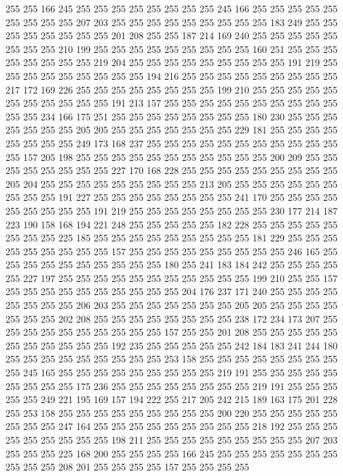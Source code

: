 255 255 166 245 255 255 255 255 255 255 255 255 245 166 255 255 255 255 255 255
255 255 255 207 203 255 255 255 255 255 255 255 255 255 183 249 255 255 255 255
255 255 255 255 201 208 255 255 187 214 169 240 255 255 255 255 255 255 255 255
210 199 255 255 255 255 255 255 255 255 255 160 251 255 255 255 255 255 255 255
255 219 204 255 255 255 255 255 255 255 255 255 191 219 255 255 255 255 255 255
255 255 255 194 216 255 255 255 255 255 255 255 255 255 217 172 169 226 255 255
255 255 255 255 255 255 199 210 255 255 255 255 255 255 255 255 255 255 255 191
213 157 255 255 255 255 255 255 255 255 255 255 255 255 234 166 175 251 255 255
255 255 255 255 255 255 180 230 255 255 255 255 255 255 255 205 205 255 255 255
255 255 255 255 229 181 255 255 255 255 255 255 255 255 249 173 168 237 255 255
255 255 255 255 255 255 255 255 255 255 157 205 198 255 255 255 255 255 255 255
255 255 255 255 200 209 255 255 255 255 255 255 255 255 227 170 168 228 255 255
255 255 255 255 255 255 255 205 204 255 255 255 255 255 255 255 255 255 213 205
255 255 255 255 255 255 255 255 255 191 227 255 255 255 255 255 255 255 255 241
170 255 255 255 255 255 255 255 255 255 191 219 255 255 255 255 255 255 255 255
230 177 214 187 223 190 158 168 194 221 248 255 255 255 255 255 182 228 255 255
255 255 255 255 255 255 225 185 255 255 255 255 255 255 255 255 255 181 229 255
255 255 255 255 255 255 255 255 157 255 255 255 255 255 255 255 255 255 246 165
255 255 255 255 255 255 255 255 255 255 180 255 241 183 184 242 255 255 255 255
255 227 197 255 255 255 255 255 255 255 255 255 255 255 199 210 255 255 157 255
255 255 255 255 255 255 255 255 255 204 176 237 171 240 255 255 255 255 255 255
255 255 206 203 255 255 255 255 255 255 255 205 205 255 255 255 255 255 255 255
202 208 255 255 255 255 255 255 255 255 238 172 234 173 207 255 255 255 255 255
255 255 255 255 255 157 255 255 201 208 255 255 255 255 255 255 255 255 255 255
255 192 235 255 255 255 255 255 242 184 183 241 244 180 255 255 255 255 255 255
255 255 255 253 158 255 255 255 255 255 255 255 255 255 245 165 255 255 255 255
255 255 255 255 255 219 191 255 255 255 255 255 255 255 255 255 175 236 255 255
255 255 255 255 255 255 219 191 255 255 255 255 255 249 221 195 169 157 194 222
255 217 205 242 215 189 163 175 201 228 255 253 158 255 255 255 255 255 255 255
255 255 200 220 255 255 255 255 255 255 255 255 247 164 255 255 255 255 255 255
255 255 255 218 192 255 255 255 255 255 255 255 255 255 198 211 255 255 255 255
255 255 255 255 255 207 203 255 255 255 225 168 200 255 255 255 255 166 245 255
255 255 255 255 255 255 255 255 255 208 201 255 255 255 255 157 255 255 255 255
